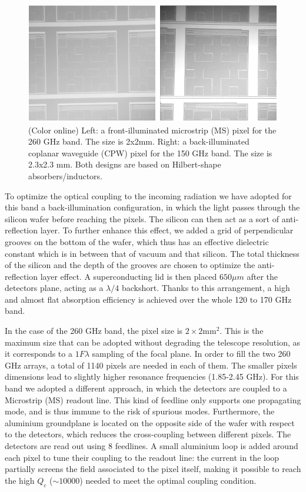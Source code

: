 \documentclass[]{aa} %
\begin{document}
\begin{figure}[h]
   \centering
    \includegraphics[width=.95\linewidth]{CPWeMS.png}
      \caption{(Color online) Left: a front-illuminated microstrip (MS) pixel for the 260 GHz band. The size is 2x2mm. Right: a back-illuminated coplanar waveguide (CPW) pixel for the 150 GHz band. The size is 2.3x2.3 mm. Both designs are based on Hilbert-shape absorbers/inductors.}
         \label{Pixels}
\end{figure}


To optimize the optical coupling to the incoming radiation we have adopted for this band a back-illumination configuration, in which the light passes through the silicon wafer before reaching the pixels. The silicon can then act as a sort of anti-reflection layer. To further enhance this effect, we added a grid of perpendicular grooves on the bottom of the wafer, which thus has an effective dielectric constant which is in between that of vacuum and that silicon. The total thickness of the silicon and the depth of the grooves are chosen to optimize the anti-reflection layer effect. A superconducting lid is then placed $650\mu m$ after the detectors plane, acting as a $\lambda/4$ backshort. Thanks to this arrangement, a high and almost flat absorption efficiency is achieved over the whole 120 to 170 GHz band.

In the case of the 260 GHz band, the pixel size is $2\times 2\mathrm{mm}^2$. This is the maximum size that can be adopted without degrading the telescope resolution, as it corresponds to a $1 F \lambda$ sampling of the focal plane. In order to fill the two 260 GHz arrays, a total of 1140 pixels are needed in each of them. The smaller pixels dimensions lead to slightly higher resonance frequencies (1.85-2.45 GHz). For this band we adopted a different approach, in which the detectors are coupled to a Microstrip (MS) readout line. This kind of feedline only supports one propagating mode, and is thus immune to the risk of spurious modes. Furthermore, the aluminium groundplane is located on the opposite side of the wafer with respect to the detectors, which reduces the cross-coupling between different pixels. The detectors are read out using 8 feedlines. A small aluminium loop is added around each pixel to tune their coupling to the readout line: the current in the loop partially screens the field associated to the pixel itself, making it possible to reach the high $Q_c$ ($\sim10000$) needed to meet the optimal coupling condition.
\end{document}
